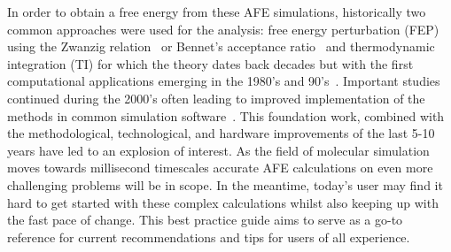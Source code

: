 \documentclass[9pt,bestpractices]{livecoms}
\begin{document}
In order to obtain a free energy from these AFE simulations, historically two common approaches were used for the analysis: free energy perturbation (FEP) using the Zwanzig relation~\cite{zwanzig1954hightemperature} or Bennet's acceptance ratio~\cite{bennett1976efficient} and thermodynamic integration (TI) for which the theory dates back decades but with the first computational applications emerging in the 1980's and 90's~\cite{kirkwood1935statistical, jorgensen1985monte, kollman1993free, wong1986dynamics, merz1989free}. Important studies continued during the 2000's often leading to improved implementation of the methods in common simulation software~\cite{vanderspoel2005gromacs, mermelstein2018fast, wang2015accurate, hedges2019biosimspace}. This foundation work, combined with the methodological, technological, and hardware improvements of the last 5-10 years have led to an explosion of interest. As the field of molecular simulation moves towards millisecond timescales accurate AFE calculations on even more challenging problems will be in scope. In the meantime, today's user may find it hard to get started with these complex calculations whilst also keeping up with the fast pace of change. This best practice guide aims to serve as a go-to reference for current recommendations and tips for users of all experience.  
\end{document}
